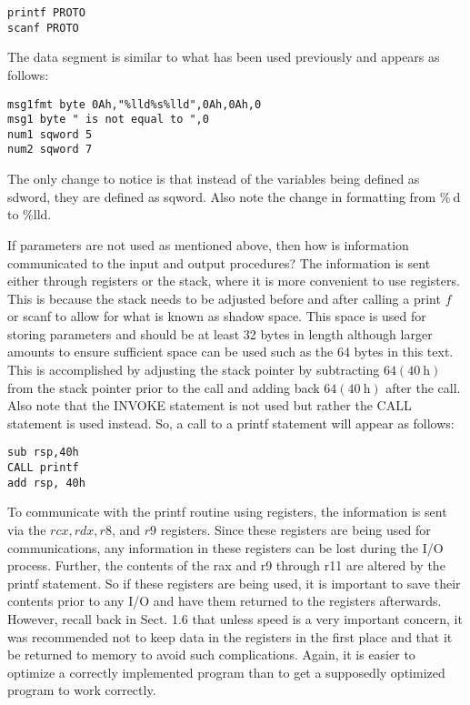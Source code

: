 \documentclass[10pt]{article}
\begin{document}
\begin{verbatim}
printf PROTO
scanf PROTO
\end{verbatim}

The data segment is similar to what has been used previously and appears as follows:

\begin{verbatim}
msg1fmt byte 0Ah,"%lld%s%lld",0Ah,0Ah,0
msg1 byte " is not equal to ",0
num1 sqword 5
num2 sqword 7
\end{verbatim}

The only change to notice is that instead of the variables being defined as sdword, they are defined as sqword. Also note the change in formatting from $\% \mathrm{~d}$ to \%lld.

If parameters are not used as mentioned above, then how is information communicated to the input and output procedures? The information is sent either through registers or the stack, where it is more convenient to use registers. This is because the stack needs to be adjusted before and after calling a print $f$ or scanf to allow for what is known as shadow space. This space is used for storing parameters and should be at least 32 bytes in length although larger amounts to ensure sufficient space can be used such as the 64 bytes in this text. This is accomplished by adjusting the stack pointer by subtracting $64(40 \mathrm{~h})$ from the stack pointer prior to the call and adding back $64(40 \mathrm{~h})$ after the call. Also note that the INVOKE statement is not used but rather the CALL statement is used instead. So, a call to a printf statement will appear as follows:

\begin{verbatim}
sub rsp,40h
CALL printf
add rsp, 40h
\end{verbatim}

To communicate with the printf routine using registers, the information is sent via the $r c x, r d x, r 8$, and $r 9$ registers. Since these registers are being used for communications, any information in these registers can be lost during the I/O process. Further, the contents of the rax and r9 through r11 are altered by the printf statement. So if these registers are being used, it is important to save their contents prior to any I/O and have them returned to the registers afterwards. However, recall back in Sect. 1.6 that unless speed is a very important concern, it was recommended not to keep data in the registers in the first place and that it be returned to memory to avoid such complications. Again, it is easier to optimize a correctly implemented program than to get a supposedly optimized program to work correctly.
\end{document}
